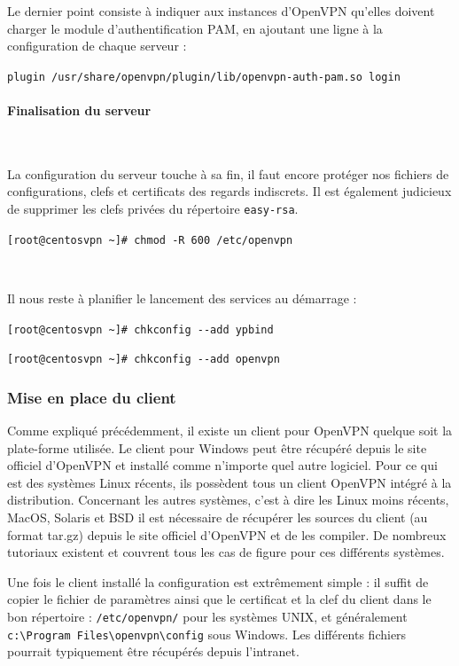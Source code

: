 Le dernier point consiste à indiquer aux instances d'OpenVPN qu'elles doivent charger le module d'authentification PAM, en ajoutant une ligne à la configuration de chaque serveur :

\verb|plugin /usr/share/openvpn/plugin/lib/openvpn-auth-pam.so login|


\paragraph{Finalisation du serveur}
~

La configuration du serveur touche à sa fin, il faut encore protéger nos fichiers de configurations, clefs et certificats des regards indiscrets. Il est également judicieux de supprimer les clefs privées du répertoire \verb|easy-rsa|.

\verb|[root@centosvpn ~]# chmod -R 600 /etc/openvpn|

~

Il nous reste à planifier le lancement des services au démarrage :

\verb|[root@centosvpn ~]# chkconfig --add ypbind|

\verb|[root@centosvpn ~]# chkconfig --add openvpn|

\subsubsection{Mise en place du client}

Comme expliqué précédemment, il existe un client pour OpenVPN quelque soit la plate-forme utilisée. Le client pour Windows peut être récupéré depuis le site officiel d'OpenVPN et installé comme n'importe quel autre logiciel. Pour ce qui est des systèmes Linux récents, ils possèdent tous un client OpenVPN intégré à la distribution. Concernant les autres systèmes, c'est à dire les Linux moins récents, MacOS, Solaris et BSD il est nécessaire de récupérer les sources du client (au format tar.gz) depuis le site officiel d'OpenVPN et de les compiler. De nombreux tutoriaux existent et couvrent tous les cas de figure pour ces différents systèmes.

Une fois le client installé la configuration est extrêmement simple : il suffit de copier le fichier de paramètres ainsi que le certificat et la clef du client dans le bon répertoire : \verb|/etc/openvpn/| pour les systèmes UNIX, et généralement \verb|c:\Program Files\openvpn\config| sous Windows. Les différents fichiers pourrait typiquement être récupérés depuis l'intranet.

